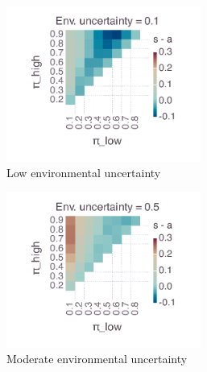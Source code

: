 \documentclass[10pt,letterpaper]{article}
\begin{document}
\begin{figure}

  \caption{Average difference in social and asocial learning frequencies, $s - a$, over
  different payoff structures defined by bandit payoffs $\pi_{high}$ and $\pi_{low}$
for three levels of environmental uncertainty. $B = 50$, $M = 20$.}
  \label{fig:expectedPayoffHeatmaps}

  \begin{subfigure}[b]{0.5\textwidth}
    \includegraphics[width=0.7\textwidth]{Figures/expected-payoff-heatmap_envUnc0p1.pdf}
  \caption{Low environmental uncertainty}
  \label{fig:expectedPayoffHeatmaps_low}
  \end{subfigure}
  \begin{subfigure}[b]{0.5\textwidth}
    \includegraphics[width=0.7\textwidth]{Figures/expected-payoff-heatmap_envUnc0p5.pdf}
  \caption{Moderate environmental uncertainty}
  \label{fig:expectedPayoffHeatmaps_med}
  \end{subfigure}
  \begin{subfigure}[b]{0.5\textwidth}

\end{subfigure}
\end{figure}
\end{document}
